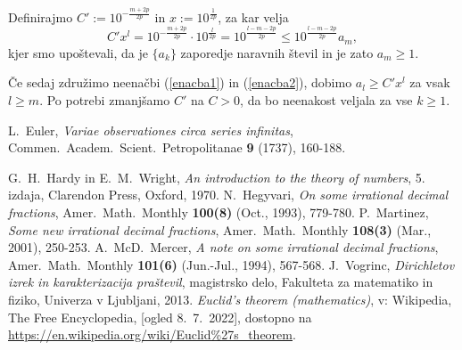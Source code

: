 \documentclass[twoside,11pt]{article}
\begin{document}
Definirajmo $C' := 10^{-\frac{m + 2p}{2p}}$ in $x := 10^{\frac{1}{2p}}$, za kar velja
\begin{equation}\label{enacba2}
     C'x^l = 10^{-\frac{m + 2p}{2p}} \cdot 10^{\frac{l}{2p}} = 10 ^{\frac{l-m-2p}{2p}}
     \leq 10 ^{\frac{l-m-2p}{2p}} a_m,
\end{equation}
kjer smo upoštevali, da je $\{a_k\}$ zaporedje naravnih števil in je zato $a_m \geq 1$.

Če sedaj združimo neenačbi (\ref{enacba1}) in (\ref{enacba2}), dobimo 
$a_l \geq C'x^l$ za vsak $l \geq m$.
Po potrebi zmanjšamo $C'$ na $C>0$, da bo neenakost veljala
za vse $k \geq 1$.

\QED







\begin{thebibliography}{1}
    L.~Euler, \emph{Variae observationes circa series infinitas},
    Commen.~Academ.~Scient.~Petropolitanae \textbf{9} (1737), 160-188.

    G.~H.~Hardy in E.~M.~Wright, \emph{An introduction to the theory of numbers}, 
    5. izdaja, Clarendon Press, Oxford, 1970.
    N.~Hegyvari, \emph{On some irrational decimal fractions},
    Amer.~Math.~Monthly \textbf{100(8)}  (Oct., 1993),  779-780.
    P.~Martinez, \emph{Some new irrational decimal fractions},
    Amer.~Math.~Monthly \textbf{108(3)}  (Mar., 2001),  250-253.
    A.~McD.~Mercer, \emph{A note on some irrational decimal fractions},
    Amer.~Math.~Monthly \textbf{101(6)}  (Jun.-Jul., 1994),  567-568.
    J.~Vogrinc, \emph{Dirichletov izrek in karakterizacija praštevil}, 
    magistrsko delo, Fakulteta za matematiko in fiziko, Univerza v Ljubljani, 2013.
    \emph{Euclid's theorem (mathematics)}, v: Wikipedia, The Free Encyclopedia, [ogled 8.~7.~2022], 
    dostopno na \url{https://en.wikipedia.org/wiki/Euclid%27s_theorem}.
    
\end{thebibliography}
\end{document}
